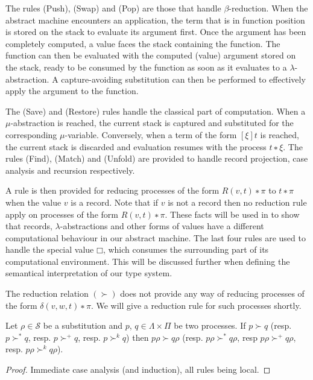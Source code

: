 The rules (Push), (Swap) and (Pop) are those that handle $β$-reduction. When
the abstract machine encounters an application, the term that is in function
position is stored on the stack to evaluate its argument first. Once the
argument has been completely computed, a value faces the stack containing the
function. The function can then be evaluated with the computed (value)
argument stored on the stack, ready to be consumed by the function as soon as
it evaluates to a $λ$-abstraction. A capture-avoiding substitution can then be
performed to effectively apply the argument to the function.

The (Save) and (Restore) rules handle the classical part of computation. When
a $μ$-abstraction is reached, the current stack is captured and substituted
for the corresponding $μ$-variable. Conversely, when a term of the form $[ξ]t$
is reached, the current stack is discarded and evaluation resumes with the
process $t ∗ ξ$. The rules (Find), (Match) and (Unfold) are provided to handle
record projection, case analysis and recursion respectively.

A rule is then provided for reducing processes of the form $R(v,t) ∗ π$ to
$t ∗ π$ when the value $v$ is a record. Note that if $v$ is not a record then
no reduction rule apply on processes of the form $R(v,t) ∗ π$. These facts
will be used in to show that records, $λ$-abstractions and other forms of
values have a different computational behaviour in our abstract machine.
The last four rules are used to handle the special value $□$, which consumes
the surrounding part of its computational environment. This will be discussed
further when defining the semantical interpretation of our type system.
\begin{remark}
  The reduction relation $(≻)$ does not provide any way of reducing processes
  of the form $δ(v,w,t) ∗ π$. We will give a reduction rule for such processes
  shortly.
\end{remark}

\begin{theorem}\label{redcompatall}
  Let $ρ ∈ \mathcal{S}$ be a substitution and $p$, $q ∈ Λ×Π$ be two processes.
  If $p ≻ q$ (resp. $p ≻^{*} q$, resp. $p ≻^{+} q$, resp. $p ≻^k q$) then
  $pρ ≻ qρ$ (resp. $pρ ≻^{*} qρ$, resp $pρ ≻^{+} qρ$, resp. $pρ ≻^k qρ$).
  \begin{proof}
    Immediate case analysis (and induction), all rules being local.
  \end{proof}
\end{theorem}

